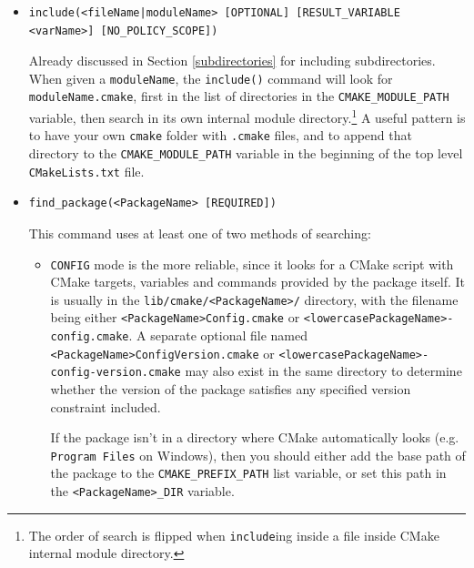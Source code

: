 \documentclass[table, xcdraw]{article}%
\begin{document}
\begin{itemize}
\item
\begin{verbatim}
include(<fileName|moduleName> [OPTIONAL] [RESULT_VARIABLE <varName>] [NO_POLICY_SCOPE])
\end{verbatim}
Already discussed in Section \ref{subdirectories} for including subdirectories. When given a \texttt{moduleName}, the \texttt{include()} command will look for \texttt{moduleName.cmake}, first in the list of directories in the \texttt{CMAKE_MODULE_PATH} variable, then search in its own internal module directory.\footnote{The order of search is flipped when \texttt{include}ing inside a file inside CMake internal module directory.} A useful pattern is to have your own \texttt{cmake} folder with \texttt{.cmake} files, and to append that directory to the \texttt{CMAKE_MODULE_PATH} variable in the beginning of the top level \texttt{CMakeLists.txt} file.

\item
\begin{verbatim}
find_package(<PackageName> [REQUIRED])
\end{verbatim} 

This command uses at least one of two methods of searching:
\begin{itemize}
    \item \texttt{CONFIG} mode is the more reliable, since it looks for a CMake script with CMake targets, variables and commands provided by the package itself. It is usually in the \texttt{lib/cmake/<PackageName>/} directory, with the filename being either \texttt{<PackageName>Config.cmake} or \texttt{<lowercasePackageName>-config.cmake}. A separate optional file named \texttt{<PackageName>ConfigVersion.cmake} or \texttt{<lowercasePackageName>-config-version.cmake} may also exist in the same directory to determine whether the version of the package satisfies any specified version constraint included.
    
    If the package isn't in a directory where CMake automatically looks (e.g. \texttt{Program Files} on Windows), then you should either add the base path of the package to the \texttt{CMAKE_PREFIX_PATH} list variable, or set this path in the \texttt{<PackageName>_DIR} variable.
    

\end{itemize}
\end{itemize}
\end{document}
